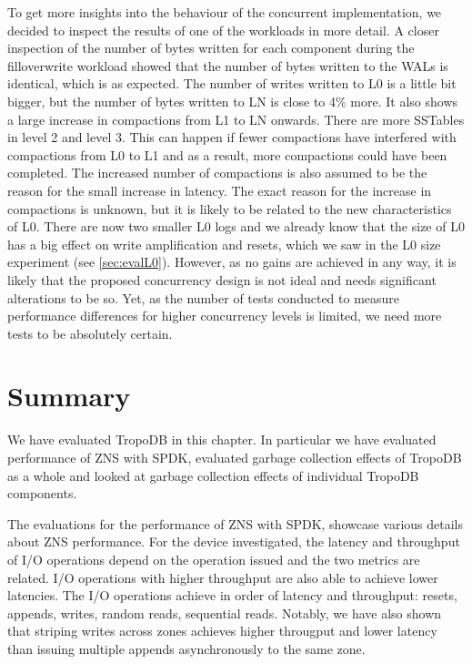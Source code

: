 To get more insights into the behaviour of the concurrent implementation, we decided to inspect the results of one of the workloads in more detail. A closer inspection of the number of bytes written for each component during the filloverwrite workload showed that the number of bytes written to the WALs is identical, which is as expected. The number of writes written to L0 is a little bit bigger, but the number of bytes written to LN is close to 4\% more. It also shows a large increase in compactions from L1 to LN onwards. There are more SSTables in level 2 and level 3. This can happen if fewer compactions have interfered with compactions from L0 to L1 and as a result, more compactions could have been completed. The increased number of compactions is also assumed to be the reason for the small increase in latency. The exact reason for the increase in compactions is unknown, but it is likely to be related to the new characteristics of L0. There are now two smaller L0 logs and we already know that the size of L0 has a big effect on write amplification and resets, which we saw in the L0 size experiment (see \autoref{sec:evalL0}). However, as no gains are achieved in any way, it is likely that the proposed concurrency design is not ideal and needs significant alterations to be so. Yet, as the number of tests conducted to measure performance differences for higher concurrency levels is limited, we need more tests to be absolutely certain. 

\section{Summary}
We have evaluated TropoDB in this chapter. In particular we have evaluated performance of ZNS with SPDK, evaluated garbage collection effects of TropoDB as a whole and looked at garbage collection effects of individual TropoDB components.

The evaluations for the performance of ZNS with SPDK, showcase various details about ZNS performance. For the device investigated, the latency and throughput of I/O operations depend on the operation issued and the two metrics are related. I/O operations with higher throughput are also able to achieve lower latencies. The I/O operations achieve in order of latency and throughput: resets, appends, writes, random reads, sequential reads. Notably, we have also shown that striping writes across zones achieves higher througput and lower latency than issuing multiple appends asynchronously to the same zone.


